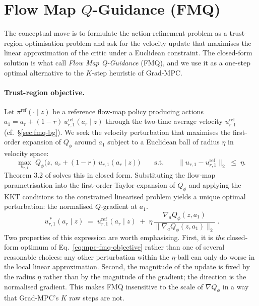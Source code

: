 \section{Flow Map $Q$-Guidance (FMQ)}
\label{sec:mpc-fmq}

The conceptual move is to formulate the action-refinement problem as a trust-region optimisation problem and ask for the velocity update that maximises the linear approximation of the critic under a Euclidean constraint. The closed-form solution is what \cite{ziakas2026aligning} call \emph{Flow Map Q-Guidance} (FMQ), and we use it as a one-step optimal alternative to the $K$-step heuristic of Grad-MPC.

\paragraph{Trust-region objective.} Let $\pi^{\mathrm{ref}}(\cdot \mid z)$ be a reference flow-map policy producing actions $a_1 = a_r + (1-r)\,u^{\mathrm{ref}}_{r,1}(a_r \mid z)$ through the two-time average velocity $u^{\mathrm{ref}}_{r,1}$ (cf.\ \S\ref{sec:fmq-bg}). We seek the velocity perturbation that maximises the first-order expansion of $Q_\phi$ around $a_1$ subject to a Euclidean ball of radius $\eta$ in velocity space:
\begin{equation}
    \max_{u_{r,1}}\; Q_\phi\!\big(z,\, a_r + (1-r)\, u_{r,1}(a_r \mid z)\big)
    \qquad\text{s.t.}\qquad
    \big\|u_{r,1} - u^{\mathrm{ref}}_{r,1}\big\|_2 \;\le\; \eta.
    \label{eq:mpc-fmq-objective}
\end{equation}
Theorem 3.2 of \cite{ziakas2026aligning} solves this in closed form. Substituting the flow-map parametrisation into the first-order Taylor expansion of $Q_\phi$ and applying the KKT conditions to the constrained linearised problem yields a unique optimal perturbation: the normalised $Q$-gradient at $a_1$.
\begin{equation}
    \boxed{\;u^{\,*}_{r,1}(a_r \mid z) \;=\; u^{\mathrm{ref}}_{r,1}(a_r \mid z) \;+\; \eta\,\frac{\nabla_a Q_\phi(z, a_1)}{\big\|\nabla_a Q_\phi(z, a_1)\big\|_2}\;.}
    \label{eq:mpc-fmq-target}
\end{equation}
Two properties of this expression are worth emphasising. First, it is \emph{the} closed-form optimum of Eq.~\eqref{eq:mpc-fmq-objective} rather than one of several reasonable choices: any other perturbation within the $\eta$-ball can only do worse in the local linear approximation. Second, the magnitude of the update is fixed by the radius $\eta$ rather than by the magnitude of the gradient; the direction is the normalised gradient. This makes FMQ insensitive to the scale of $\nabla Q_\phi$ in a way that Grad-MPC's $K$ raw steps are not.


